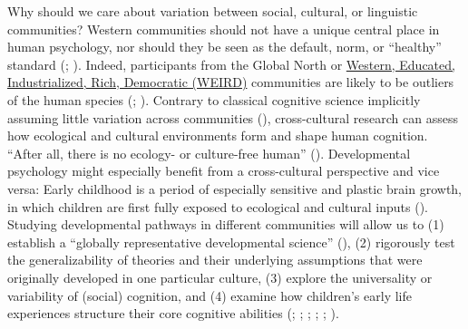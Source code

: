 \documentclass[
]{scrbook}
\begin{document}
Why should we care about variation between social, cultural, or linguistic communities? Western communities should not have a unique central place in human psychology, nor should they be seen as the default, norm, or ``healthy'' standard (; ). Indeed, participants from the Global North or \hyperref[acronyms_WEIRD]{Western, Educated, Industrialized, Rich, Democratic (WEIRD)} communities are likely to be outliers of the human species (; ). Contrary to classical cognitive science implicitly assuming little variation across communities (), cross-cultural research can assess how ecological and cultural environments form and shape human cognition. ``After all, there is no ecology- or culture-free human'' (). Developmental psychology might especially benefit from a cross-cultural perspective and vice versa: Early childhood is a period of especially sensitive and plastic brain growth, in which children are first fully exposed to ecological and cultural inputs (). Studying developmental pathways in different communities will allow us to (1) establish a ``globally representative developmental science'' (), (2) rigorously test the generalizability of theories and their underlying assumptions that were originally developed in one particular culture, (3) explore the universality or variability of (social) cognition, and (4) examine how children's early life experiences structure their core cognitive abilities (; ; ; ; ; ).
\end{document}
